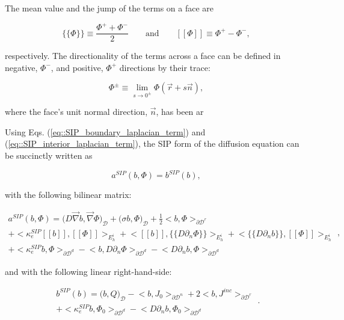 The mean value and the jump of the terms on a face are

\begin{equation}
\label{eq::solution_mean_and_jump}
\{\!\{  \Phi \}\!\} \equiv \frac{\Phi^+ + \Phi^-}{2} \qquad \text{and} \qquad [\![   \Phi ]\!] \equiv \Phi^+ - \Phi^- ,
\end{equation}

\noindent respectively. The directionality of the terms across a face can be defined in negative, $\Phi^-$, and positive, $\Phi^+$ directions by their trace:

\begin{equation}
\label{eq::solution_trace}
\Phi^{\pm} \equiv \lim_{s \rightarrow 0^{\pm}} \Phi (\vec{r} + s \vec{n}),
\end{equation}

\noindent where the face's unit normal direction, $\vec{n}$, has been ar

Using Eqs. (\ref{eq::SIP_boundary_laplacian_term}) and (\ref{eq::SIP_interior_laplacian_term}), the SIP form of the diffusion equation can be succinctly written as

\begin{equation}
a^{SIP}( b, \Phi) = b^{SIP}(b),
\label{eq::SIP_weak_form}
\end{equation}

\noindent with the following bilinear matrix:

\begin{equation}
\label{eq::SIP_bilinear_form}
\begin{aligned}
a^{SIP}( b, \Phi)  = \Big(  D \vec{\nabla}  b , \vec{\nabla} \Phi  \Big)_{\mathcal{D}} + \Big(  \sigma   b ,  \Phi  \Big)_{\mathcal{D}}  +  \frac{1}{2} \Big<    b , \Phi \Big>_{\partial \mathcal{D}^r}   \\
+  \Big< \kappa_e^{SIP} [\![   b ]\!] , [\![  \Phi ]\!]\Big>_{E_h^i} + \Big<  [\![   b ]\!] , \{\!\{  D \partial_n \Phi \}\!\}\Big>_{E_h^i}  + \Big< \{\!\{  D \partial_n  b \}\!\} , [\![ \Phi ]\!]\Big>_{E_h^i} \\
+ \Big< \kappa_e^{SIP}   b ,   \Phi \Big>_{\partial \mathcal{D}^d} - \Big<   b  ,  D \partial_n \Phi \Big>_{\partial \mathcal{D}^d} - \Big<   D 				\partial_n  b , \Phi \Big>_{\partial \mathcal{D}^d}  
\end{aligned} ,
\end{equation}

\noindent and with the following linear right-hand-side:

\begin{equation}
\label{eq::SIP_linear_form}
\begin{aligned}
b^{SIP} (b) = \Big(  b, Q  \Big)_{\mathcal{D}}  - \Big<   b, J_{0}  \Big>_{\partial \mathcal{D}^n} +  2 \Big<  b, J^{inc}  \Big>_{\partial	\mathcal{D}^r} \\ + \Big< \kappa_e^{SIP}  b, \Phi_0  \Big>_{\partial \mathcal{D}^d} - \Big<    D \partial_n b ,\Phi_0 \Big>_{\partial	\mathcal{D}^d} 
\end{aligned} .
\end{equation}

